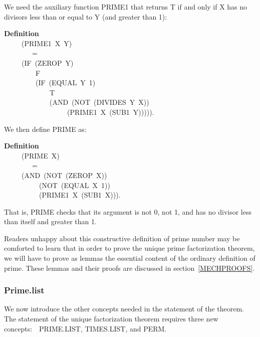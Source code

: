 \documentclass[10pt]{book}
\newenvironment{pubasis}{\begin{flushleft}}{\end{flushleft}}
\newcommand{\axiomordefinition}[1]{\vspace{6pt}\Large\textsf{\textbf{#1}}\normalsize}
\begin{document}
We  need the auxiliary function PRIME1 that returns T
if and only if X has no divisors less than or equal to Y (and greater than 1):

\begin{pubasis}
\axiomordefinition{Definition}\\
~~~~~(PRIME1~X~Y)\\
~~~~~~~~=\\
~~~~~(IF~(ZEROP~Y)\\
~~~~~~~~~F\\
~~~~~~~~~(IF~(EQUAL~Y~1)\\
~~~~~~~~~~~~~T\\
~~~~~~~~~~~~~(AND~(NOT~(DIVIDES~Y~X))\\
~~~~~~~~~~~~~~~~~~(PRIME1~X~(SUB1~Y))))).\\
\end{pubasis}
We  then define PRIME as:
\begin{pubasis}
\axiomordefinition{Definition}\\
~~~~~(PRIME~X)\\
~~~~~~~~=\\
~~~~~(AND~(NOT~(ZEROP~X))\\
~~~~~~~~~~(NOT~(EQUAL~X~1))\\
~~~~~~~~~~(PRIME1~X~(SUB1~X))).\\
\end{pubasis}
That is, PRIME checks that its argument is not 0, not 1,
and  has no divisor less than itself and greater than 1.

Readers unhappy about this constructive definition of prime number
may be comforted to learn that in order to prove the
unique prime factorization theorem, we will have to
prove as lemmas the essential content of the
ordinary  definition of prime.  These lemmas and their
proofs are discussed in section~\ref{MECHPROOFS}.

\subsubsection{Prime.list}
\label{TIMES.LIST}
We now introduce the other concepts needed
in the statement of the theorem.
The statement of the unique factorization theorem
requires three new concepts:~~PRIME.LIST,
TIMES.LIST, and PERM.
\end{document}
